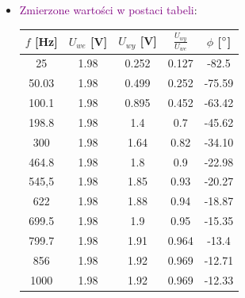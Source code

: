 \begin{itemize}
    \item \textcolor{purple}{Zmierzone wartości w postaci tabeli}:
\begin{center}
    \Large %
    \label{poprawa:pomiary_CR}
    \begin{tabular}{|>{\columncolor[gray]{0.8}}c|>{\columncolor[gray]{0.8}}c|c|>{\columncolor[gray]{0.8}}c|c|}
         \hline
         $f$ [Hz] & $U_{we}$ [V] & $U_{wy}$ [V] & $\frac{U_{wy}}{U_{we}}$ & $\phi$ [$\degree$] \\
         \hline
         25 & 1.98 & 0.252 & 0.127 & -82.5 \\
         \hline
         50.03 & 1.98 & 0.499 & 0.252 & -75.59 \\
         \hline
         100.1 & 1.98 & 0.895 & 0.452 & -63.42 \\
         \hline
         198.8 & 1.98 & 1.4 & 0.7 & -45.62 \\
         \hline
         300 & 1.98 & 1.64 & 0.82 & -34.10 \\
         \hline
         464.8 & 1.98 & 1.8 & 0.9 & -22.98 \\
         \hline
         545,5 & 1.98 & 1.85 & 0.93 & -20.27 \\
         \hline
         622 & 1.98 & 1.88 & 0.94 & -18.87 \\
         \hline
         699.5 & 1.98 & 1.9 & 0.95 & -15.35 \\
         \hline
         799.7 & 1.98 & 1.91 & 0.964 & -13.4 \\
         \hline
         856 & 1.98 & 1.92 & 0.969 & -12.71 \\
         \hline
         1000 & 1.98 & 1.92 & 0.969 & -12.33 \\
         \hline
    \end{tabular}
\end{center}


\end{itemize}
